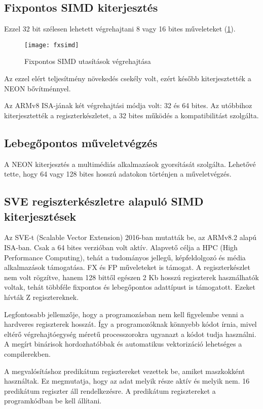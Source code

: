  \subsection{Fixpontos SIMD kiterjesztés}
 Ezzel 32 bit szélesen lehetett végrehajtani 8 vagy 16 bites műveleteket (\ref{fig:fxsimd}).
 \begin{figure}[H]
    \texttt{[image: fxsimd]}
    \centering
    \caption{Fixpontos SIMD utasítások végrehajtása}
    \label{fig:fxsimd}
\end{figure}
Az ezzel elért teljesítmény növekedés csekély volt, ezért később kiterjesztették a NEON bővítménnyel.

Az ARMv8 ISA-jának két végrehajtási módja volt: 32 és 64 bites.
Az utóbbihoz kiterjesztették a regiszterkészletet, a 32 bites működés a kompatibilitást szolgálta.

\subsection{Lebegőpontos műveletvégzés}
A NEON kiterjesztés a multimédiás alkalmazások gyorsítását szolgálta.
Lehetővé tette, hogy 64 vagy 128 bites hosszú adatokon történjen a műveletvégzés.

\subsection{SVE regiszterkészletre alapuló SIMD kiterjesztések}
Az SVE-t (Scalable Vector Extension) 2016-ban mutatták be, az ARMv8.2 alapú ISA-ban.
Csak a 64 bites verzióban volt aktív.
Alapvető célja a HPC (High Performance Computing), tehát a tudományos jellegű, képfeldolgozó és média alkalmazások támogatása.
FX és FP műveleteket is támogat.
A regiszterkészlet nem volt rögzítve, hanem 128 bittől egészen 2 Kb hosszú regiszterek használhatók voltak, tehát többféle fixpontos és lebegőpontos adattípust is támogatott.
Ezeket hívták Z regisztereknek.

Legfontosabb jellemzője, hogy a programozásban nem kell figyelembe venni a hardveres regiszterek hosszát.
Így a programozóknak könnyebb kódot írnia, mivel eltérő végrehajtóegység méretű processzorokra ugyanazt a kódot tudja használni.
A megírt binárisok hordozhatóbbak és automatikus vektorizáció lehetséges a compilerekben.

A megvalósításhoz predikátum regisztereket vezettek be, amiket maszkokként használtak.
Ez megmutatja, hogy az adat melyik része aktív és melyik nem.
16 predikátum regiszter áll rendelkezésre.
A predikátum regisztereket a programkódban be kell állítani.

